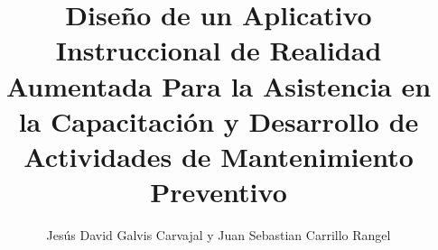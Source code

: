 \documentclass{ara}
\title{Diseño de un Aplicativo Instruccional de Realidad Aumentada Para la Asistencia en la Capacitación y Desarrollo de Actividades de Mantenimiento Preventivo}
\author{Jesús David Galvis Carvajal y Juan Sebastian Carrillo Rangel}
\begin{document}
    \coverpage

    
    

    \tableofcontents\clearpage
    \listoftables\clearpage
    \listoffigures\clearpage
    \listofappendices\clearpage

    
    
    
    
    
    
    
    

    
    

    
    
\end{document}
